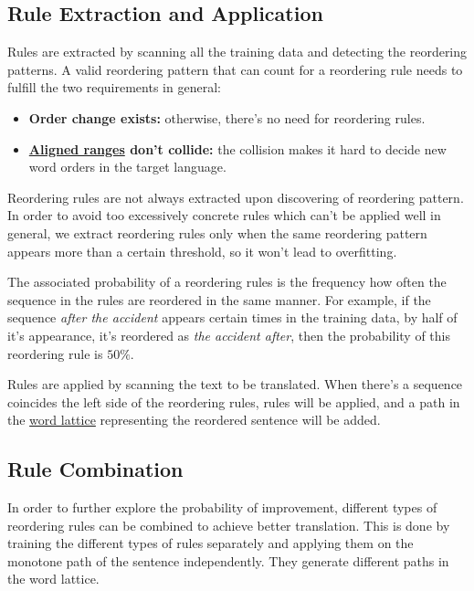 \subsection{Rule Extraction and Application}
\label{general}

Rules are extracted by scanning all the training data and detecting the reordering patterns. A valid reordering pattern that can count for a reordering rule needs to fulfill the two requirements in general:
\begin{itemize}
\setlength{\itemsep}{0cm}%
\setlength{\parskip}{0cm}%
\item \textbf{Order change exists:} otherwise, there's no need for reordering rules.
\item \textbf{\hyperref[alignedrange]{Aligned ranges} don't collide:} the collision makes it hard to decide new word orders in the target language.
\end{itemize}

Reordering rules are not always extracted upon discovering of reordering pattern. In order to avoid too excessively concrete rules which can't be applied well in general, we extract reordering rules only when the same reordering pattern appears more than a certain threshold, so it won't lead to overfitting.

The associated probability of a reordering rules is the frequency how often the sequence in the rules are reordered in the same manner. For example, if the sequence \emph{after the accident} appears certain times in the training data, by half of it's appearance, it's reordered as \emph{the accident after}, then the probability of this reordering rule is $50\%$.

Rules are applied by scanning the text to be translated. When there's a sequence coincides the left side of the reordering rules, rules will be applied, and a path in the \hyperref[ch:Foundations:sec:Lattices]{word lattice} representing the reordered sentence will be added.

\subsection{Rule Combination}

In order to further explore the probability of improvement, different types of reordering rules can be combined to achieve better translation. This is done by training the different types of rules separately and applying them on the monotone path of the sentence independently. They generate different paths in the word lattice.

